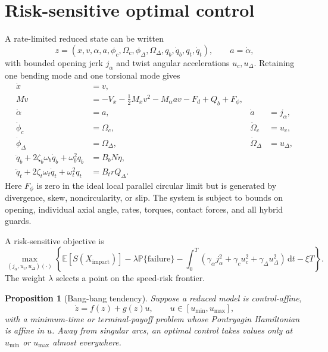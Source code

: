 \documentclass[11pt]{article}
\numberwithin{equation}{section}
\newtheorem{proposition}{Proposition}[section]
\theoremstyle{definition}
\theoremstyle{remark}
\newcommand{\dd}{\,\mathrm{d}}
\newcommand{\E}{\mathbb{E}}
\newcommand{\Prob}{\mathbb{P}}
\begin{document}
\section{Risk-sensitive optimal control}

A rate-limited reduced state can be written
\begin{equation}
  z=(x,v,\alpha,a,
  \phi_c,\Omega_c,\phi_\Delta,\Omega_\Delta,
  q_b,\dot q_b,q_t,\dot q_t),
  \qquad a=\dot\alpha,
  \label{eq:controlstate}
\end{equation}
with bounded opening jerk $j_\alpha$ and twist angular accelerations $u_c,u_\Delta$.  Retaining one bending mode and one torsional mode gives
\begin{align}
  \dot x&=v,\\
  M\dot v&=-V_x-\frac12M_xv^2-M_\alpha av-F_d+Q_b+F_\phi,\\
  \dot\alpha&=a,
  &\dot a&=j_\alpha,\\
  \dot\phi_c&=\Omega_c,
  &\dot\Omega_c&=u_c,\\
  \dot\phi_\Delta&=\Omega_\Delta,
  &\dot\Omega_\Delta&=u_\Delta,\\
  \ddot q_b+2\zeta_b\omega_b\dot q_b+\omega_b^2q_b&=B_bN\eta,\\
  \ddot q_t+2\zeta_t\omega_t\dot q_t+\omega_t^2q_t&=B_t rQ_\Delta.
  \label{eq:controlsystem}
\end{align}
Here $F_\phi$ is zero in the ideal local parallel circular limit but is generated by divergence, skew, noncircularity, or slip.  The system is subject to bounds on opening, individual axial angle, rates, torques, contact forces, and all hybrid guards.

A risk-sensitive objective is
\begin{equation}
  \max_{(j_\alpha,u_c,u_\Delta)(\cdot)}\left\{
  \E[S(X_{\mathrm{impact}})]
  -\lambda\Prob\{\text{failure}\}
  -\int_0^T
   \left(\gamma_\alpha j_\alpha^2+
   \gamma_cu_c^2+\gamma_\Delta u_\Delta^2\right)\dd t
  -\xi T
  \right\}.
  \label{eq:riskobjective}
\end{equation}
The weight $\lambda$ selects a point on the speed-risk frontier.

\begin{proposition}[Bang-bang tendency]
Suppose a reduced model is control-affine,
\begin{equation}
  \dot z=f(z)+g(z)u,
  \qquad u\in[u_{\min},u_{\max}],
  \label{eq:affine}
\end{equation}
with a minimum-time or terminal-payoff problem whose Pontryagin Hamiltonian is affine in $u$.  Away from singular arcs, an optimal control takes values only at $u_{\min}$ or $u_{\max}$ almost everywhere.
\end{proposition}
\end{document}
